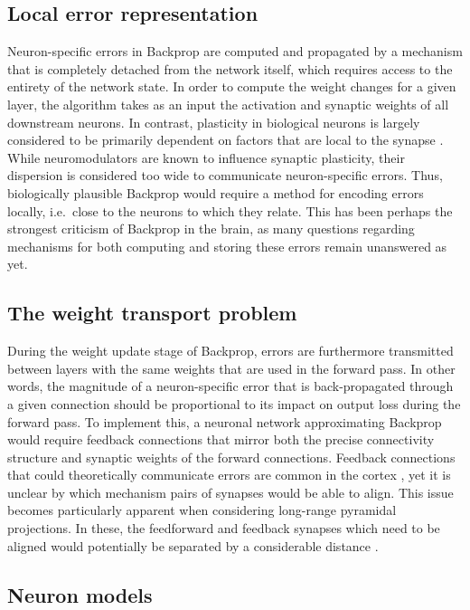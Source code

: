 \subsection{Local error representation}\label{sec-local-error}

Neuron-specific errors in Backprop are computed and propagated by a mechanism that is completely detached from the
network itself, which requires access to the entirety of the network state. In order to compute the weight changes for a
given layer, the algorithm takes as an input the activation and synaptic weights of all downstream neurons. In contrast,
plasticity in biological neurons is largely considered to be primarily dependent on factors that are local to the
synapse \citep{Abbott2000,magee2020synaptic,urbanczik2014learning}. While neuromodulators are known to influence
synaptic plasticity, their dispersion is considered too wide to communicate neuron-specific errors. Thus, biologically
plausible Backprop would require a method for encoding errors locally, i.e.\ close to the neurons to which they relate.
This has been perhaps the strongest criticism of Backprop in the brain, as many questions regarding mechanisms for both
computing and storing these errors remain unanswered as yet.

\subsection{The weight transport problem}

During the weight update stage of Backprop, errors are furthermore transmitted between layers with the same weights that
are used in the forward pass. In other words, the magnitude of a neuron-specific error that is back-propagated through a
given connection should be proportional to its impact on output loss during the forward pass. To implement this, a
neuronal network approximating Backprop would require feedback connections that mirror both the precise connectivity
structure and synaptic weights of the forward connections. Feedback connections that could theoretically communicate
errors are common in the cortex \citep{Gilbert2013}, yet it is unclear by which mechanism pairs of synapses would be
able to align. This issue becomes particularly apparent when considering long-range pyramidal projections. In these, the
feedforward and feedback synapses which need to be aligned would potentially be separated by a considerable distance
\citep{gerfen2018long}.

\subsection{Neuron models}\label{sec-neuron-models}

